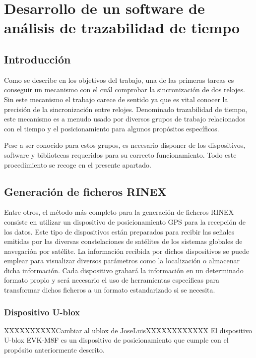 \chapter{Desarrollo de un software de análisis de trazabilidad de tiempo}

\section{Introducción}

Como se describe en los objetivos del trabajo, una de las primeras tareas es conseguir un mecanismo con el cuál comprobar la sincronización de dos relojes. Sin este mecanismo el trabajo carece de sentido ya que es vital conocer la precisión de la sincronización entre relojes. Denominado trazabilidad de tiempo, este mecanismo es a menudo usado por diversos grupos de trabajo relacionados con el tiempo y el posicionamiento para algunos propósitos específicos.\newline

Pese a ser conocido para estos grupos, es necesario disponer de los dispositivos, software y bibliotecas requeridos para su correcto funcionamiento. Todo este procedimiento se recoge en el presente apartado.

\section{Generación de ficheros RINEX}
Entre otros, el método más completo para la generación de ficheros RINEX consiste en utilizar un dispositivo de posicionamiento GPS para la recepción de los datos. Este tipo de dispositivos están preparados para recibir las señales emitidas por las diversas constelaciones de satélites de los sistemas globales de navegación por satélite. La información recibida por dichos dispositivos se puede emplear para visualizar diversos parámetros como la localización o almacenar dicha información. Cada dispositivo grabará la información en un determinado formato propio y será necesario el uso de herramientas específicas para transformar dichos ficheros a un formato estandarizado si se necesita.

\subsection{Dispositivo U-blox}
XXXXXXXXXXCambiar al ublox de JoseLuisXXXXXXXXXXXX
El dispositivo U-blox EVK-M8F es un dispositivo de posicionamiento que cumple con el propósito anteriormente descrito. \newline

